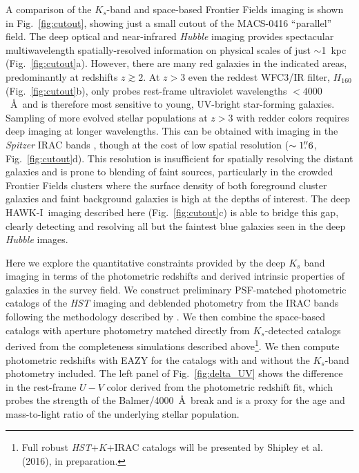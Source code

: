 \documentclass[preprint2]{aastex6}
\gdef\HAWKI{\mbox{HAWK-I}}
\begin{document}
A comparison of the $K_s$-band and space-based Frontier Fields imaging is shown in Fig.~\ref{fig:cutout}, showing just a small cutout of the MACS-0416 ``parallel'' field.  The deep optical and near-infrared \textit{Hubble} imaging provides spectacular multiwavelength spatially-resolved information on physical scales of just $\sim$1~kpc (Fig.~\ref{fig:cutout}a).  However, there are many red galaxies in the indicated areas, predominantly at redshifts $z\gtrsim2$.  At $z>3$ even the reddest WFC3/IR filter, $H_{160}$ (Fig.~\ref{fig:cutout}b), only probes rest-frame ultraviolet wavelengths $<4000$~\AA\ and is therefore most sensitive to young, UV-bright star-forming galaxies.  Sampling of more evolved stellar populations at $z>3$ with redder colors requires deep imaging at longer wavelengths.  This can be obtained with imaging in the \textit{Spitzer} IRAC bands \citep[e.g.,][]{marchesini:10, stefanon:13, stefanon:15}, though at the cost of low spatial resolution ($\sim1\mbox{$.\!\!^{\prime\prime}$}6$, Fig.~\ref{fig:cutout}d).  This resolution is insufficient for spatially resolving the distant galaxies and is prone to blending of faint sources, particularly in the crowded Frontier Fields clusters where the surface density of both foreground cluster galaxies and faint background galaxies is high at the depths of interest.  The deep \HAWKI\ imaging described here (Fig.~\ref{fig:cutout}c) is able to bridge this gap, clearly detecting and resolving all but the faintest blue galaxies seen in the deep \textit{Hubble} images.  

Here we explore the quantitative constraints provided by the deep $K_s$ band imaging in terms of the photometric redshifts and derived intrinsic properties of galaxies in the survey field.  We construct preliminary PSF-matched photometric catalogs of the \textit{HST} imaging and deblended photometry from the IRAC bands following the methodology described by \cite{skelton:14}. We then combine the space-based catalogs with aperture photometry matched directly from $K_s$-detected catalogs derived from the completeness simulations described above\footnote{Full robust \textit{HST}+$K$+IRAC catalogs will be presented by Shipley et al. (2016), in preparation.}.  We then compute photometric redshifts with EAZY \citep{brammer:08} for the catalogs with and without the $K_s$-band photometry included.  The left panel of Fig.~\ref{fig:delta_UV} shows the difference in the rest-frame $U-V$ color derived from the photometric redshift fit, which probes the strength of the Balmer/4000~\AA\ break and is a proxy for the age and mass-to-light ratio of the underlying stellar population.  
\end{document}
